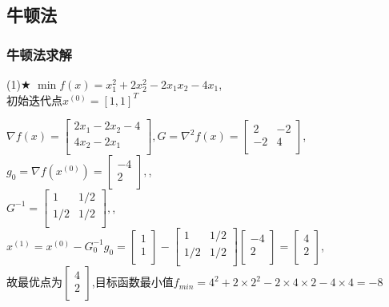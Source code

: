 \subsection{牛顿法}

\subsubsection{牛顿法求解}

\begin{problem}{(1)$\bigstar$}
    $\min f(x)=x_1^2+2x_2^2-2x_1x_2-4x_1$,\\
    初始迭代点${x^{(0)}}=[1,1]^T$
\end{problem}
\begin{solution}
    $\nabla f(x)=\begin{bmatrix}
        2x_1-2x_2-4  \\
        4x_2-2x_1  \\
    \end{bmatrix}, G=\nabla^2 f(x)=\begin{bmatrix}
        2   & -2  \\
        -2  & 4  \\
    \end{bmatrix}$,\\
    $g_0=\nabla f(x^{(0)})=\begin{bmatrix} -4\\2\\\end{bmatrix},$,\\
    $G^{-1}=\begin{bmatrix}
        1   & 1/2\\
        1/2 & 1/2\\
    \end{bmatrix},$,\\
    $x^{(1)}=x^{(0)}-G_0^{-1}g_0=\begin{bmatrix} 1\\1\\\end{bmatrix}-\begin{bmatrix}
        1   & 1/2\\
        1/2 & 1/2\\
    \end{bmatrix}\begin{bmatrix} -4\\2\\\end{bmatrix}=\begin{bmatrix} 4\\2\\\end{bmatrix}$,\\
    故最优点为$\begin{bmatrix} 4\\2\\\end{bmatrix}$,目标函数最小值$f_{min}=4^2+2\times2^2-2\times4\times2-4\times4=-8$
\end{solution}

